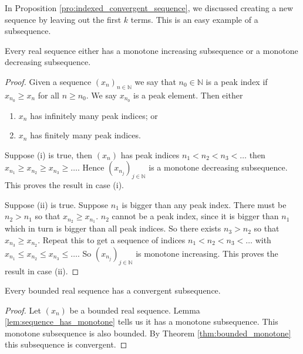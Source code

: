 \begin{remark}
    In Proposition \ref{pro:indexed_convergent_sequence}, we discussed creating a new sequence by leaving out the first $k$ terms. This is an easy example of a subsequence.
\end{remark}

\begin{lemma}\label{lem:sequence_has_monotone}
    Every real sequence either has a monotone increasing subsequence or a monotone decreasing subsequence.
\end{lemma}

\begin{proof}
    Given a sequence $(x_n)_{n\in\mathbb N}$ we say that $n_0\in\mathbb N$ is a peak index if $x_{n_0}\geq x_n$ for all $n\geq n_0$. We say $x_{n_0}$ is a peak element. Then either
    \begin{enumerate}
    	\item $x_n$ has infinitely many peak indices; or
		\item $x_n$ has finitely many peak indices.
    \end{enumerate}
    
    Suppose (i) is true, then $(x_n)$ has peak indices $n_1<n_2<n_3<\ldots$ then $x_{n_1}\geq x_{n_2}\geq x_{n_3}\geq\ldots$. Hence $(x_{n_j})_{j\in\mathbb N}$ is a monotone decreasing subsequence. This proves the result in case (i). 
    
    Suppose (ii) is true. Suppose $n_1$ is bigger than any peak index. There must be $n_2>n_1$ so that $x_{n_2}\geq x_{n_1}$. $n_2$ cannot be a peak index, since it is bigger than $n_1$ which in turn is bigger than all peak indices. So there exists $n_3>n_2$ so that $x_{n_3}\geq x_{n_2}$. Repeat this to get a sequence of indices $n_1<n_2<n_3<\ldots$ with $x_{n_1}\leq x_{n_2}\leq x_{n_3}\leq\ldots$. So $(x_{n_j})_{j\in\mathbb N}$ is monotone increasing. This proves the result in case (ii).
\end{proof}

\begin{theorem}
	Every bounded real sequence has a convergent subsequence.
\end{theorem}

\begin{proof}
	Let $(x_n)$ be a bounded real sequence. Lemma \ref{lem:sequence_has_monotone} tells us it has a monotone subsequence. This monotone subsequence is also bounded. By Theorem \ref{thm:bounded_monotone} this subsequence is convergent.
\end{proof}


